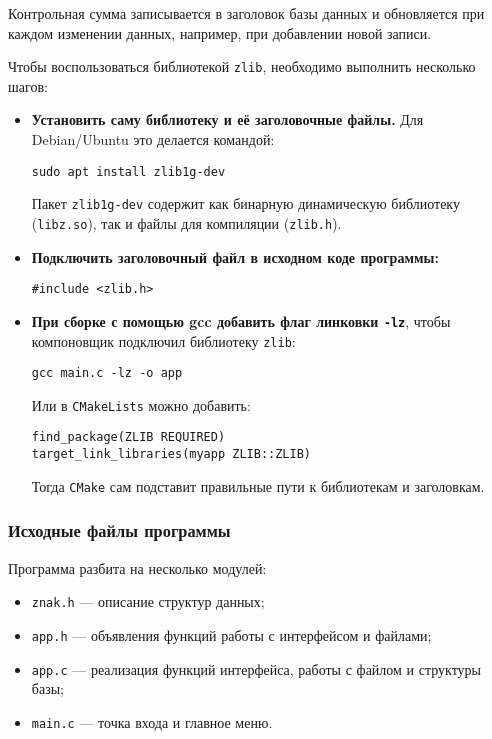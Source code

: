 Контрольная сумма записывается в заголовок базы данных и обновляется при каждом изменении данных, например, при добавлении новой записи.

Чтобы воспользоваться библиотекой \texttt{zlib}, необходимо выполнить несколько шагов:

\begin{itemize}
\item \textbf{Установить саму библиотеку и её заголовочные файлы.}
Для Debian/Ubuntu это делается командой:
\begin{verbatim}
sudo apt install zlib1g-dev
\end{verbatim}
Пакет \texttt{zlib1g-dev} содержит как бинарную динамическую библиотеку (\texttt{libz.so}), так и файлы для компиляции (\texttt{zlib.h}).

\item \textbf{Подключить заголовочный файл в исходном коде программы:}
\begin{verbatim}
#include <zlib.h>
\end{verbatim}

\item \textbf{При сборке с помощью gcc добавить флаг линковки \texttt{-lz}}, чтобы компоновщик подключил библиотеку \texttt{zlib}:
\begin{verbatim}
gcc main.c -lz -o app
\end{verbatim}

Или в \texttt{CMakeLists} можно добавить:
\begin{verbatim}
find_package(ZLIB REQUIRED)
target_link_libraries(myapp ZLIB::ZLIB)
\end{verbatim}
Тогда \texttt{CMake} сам подставит правильные пути к библиотекам и заголовкам.

\end{itemize}

\subsubsection{Исходные файлы программы}

Программа разбита на несколько модулей:

\begin{itemize}
    \item \texttt{znak.h} --- описание структур данных;
    \item \texttt{app.h} --- объявления функций работы с интерфейсом и файлами;
    \item \texttt{app.c} --- реализация функций интерфейса, работы с файлом и структуры базы;
    \item \texttt{main.c} --- точка входа и главное меню.
\end{itemize}

